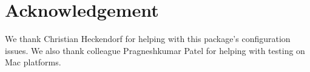 \section*{Acknowledgement}

We thank Christian Heckendorf for helping with this
package's configuration issues.  We also thank colleague Pragneshkumar
Patel for helping with testing on Mac platforms.
